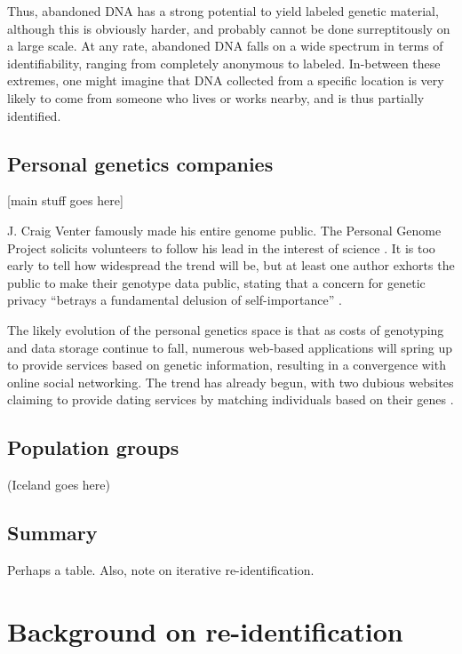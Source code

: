 \documentclass{article}
\begin{document}
Thus, abandoned DNA has a strong potential to yield labeled genetic material, although this is obviously harder, and probably cannot be done surreptitously on a large scale. At any rate, abandoned DNA falls on a wide spectrum in terms of identifiability, ranging from completely anonymous to labeled.  In-between these extremes, one might imagine that DNA collected from a specific location is very likely to come from someone who lives or works nearby, and is thus partially identified.



\subsection{Personal genetics companies}

[main stuff goes here]

J. Craig Venter famously made his entire genome public. The Personal Genome Project solicits volunteers to follow his lead in the interest of science \cite{personal-genomes}. It is too early to tell how widespread the trend will be, but at least one author exhorts the public to make their genotype data public, stating that a concern for genetic privacy ``betrays a fundamental delusion of self-importance'' \cite{delusion}.

The likely evolution of the personal genetics space is that as costs of genotyping and data storage continue to fall, numerous web-based applications will spring up to provide services based on genetic information, resulting in a convergence with online social networking. The trend has already begun, with two dubious websites claiming to provide dating services by matching individuals based on their genes \cite{genetic-dating-scam}.

\subsection{Population groups}
(Iceland goes here)

\subsection{Summary}
Perhaps a table. Also, note on iterative re-identification.


\section{Background on re-identification}
\label{reidentification}
\end{document}

